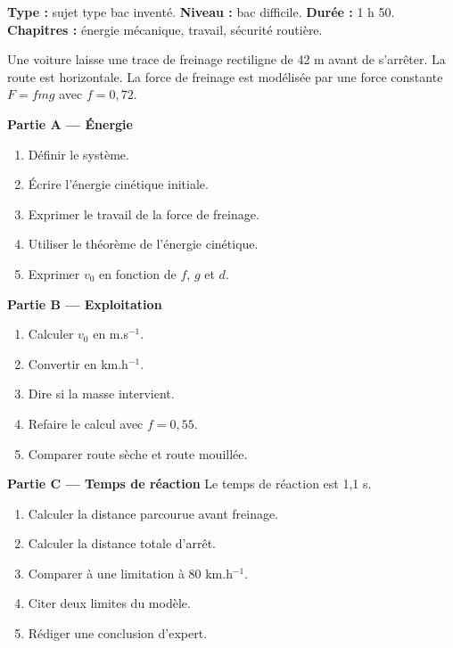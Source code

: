 \documentclass[11pt,a4paper]{article}
\begin{document}
\hypertarget{PC-LONG-02}{}
\begin{sujettype}
\textbf{Type :} sujet type bac inventé.  
\textbf{Niveau :} bac difficile.  
\textbf{Durée :} 1 h 50.  
\textbf{Chapitres :} énergie mécanique, travail, sécurité routière.

Une voiture laisse une trace de freinage rectiligne de 42 m avant de s'arrêter. La route est horizontale. La force de freinage est modélisée par une force constante $F=fmg$ avec $f=0{,}72$.

\textbf{Partie A — Énergie}
\begin{enumerate}
  \item Définir le système.
  \item Écrire l'énergie cinétique initiale.
  \item Exprimer le travail de la force de freinage.
  \item Utiliser le théorème de l'énergie cinétique.
  \item Exprimer $v_0$ en fonction de $f$, $g$ et $d$.
\end{enumerate}

\textbf{Partie B — Exploitation}
\begin{enumerate}
  \item Calculer $v_0$ en m.s$^{-1}$.
  \item Convertir en km.h$^{-1}$.
  \item Dire si la masse intervient.
  \item Refaire le calcul avec $f=0{,}55$.
  \item Comparer route sèche et route mouillée.
\end{enumerate}

\textbf{Partie C — Temps de réaction}
Le temps de réaction est 1,1 s.
\begin{enumerate}
  \item Calculer la distance parcourue avant freinage.
  \item Calculer la distance totale d'arrêt.
  \item Comparer à une limitation à 80 km.h$^{-1}$.
  \item Citer deux limites du modèle.
  \item Rédiger une conclusion d'expert.
\end{enumerate}
\end{sujettype}
\end{document}
